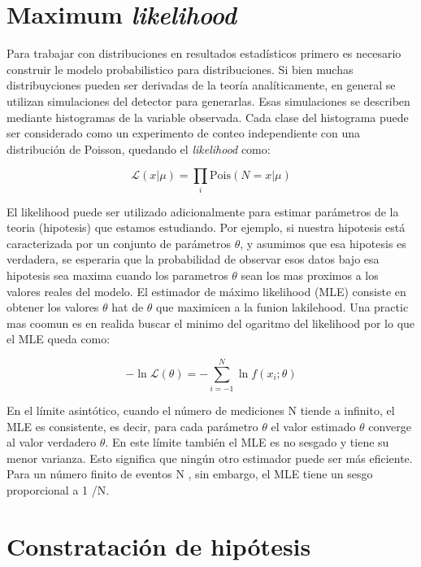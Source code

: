 \section{Maximum \textit{likelihood}}

Para trabajar con distribuciones en resultados estadísticos primero es necesario construir le modelo probabilistico para distribuciones. Si bien muchas distribuyciones pueden ser derivadas de la teoría analíticamente, en general se utilizan simulaciones del detector para generarlas. Esas simulaciones se describen mediante histogramas de la variable observada. Cada clase del histograma puede ser considerado como un experimento de conteo independiente con una distribución de Poisson, quedando el \textit{likelihood} como:

\begin{equation}
	\mathcal{L}(x|\mu) = \prod_i \text{Pois}(N=x|\mu) 
\end{equation}


El likelihood puede ser utilizado adicionalmente para estimar parámetros de la teoria (hipotesis) que estamos estudiando. Por ejemplo, si nuestra hipotesis está caracterizada por un conjunto de parámetros \textbf{$\theta$}, y asumimos que esa hipotesis es verdadera, se esperaria que la probabilidad de observar esos datos bajo esa hipotesis sea maxima cuando los parametros \textbf{$\theta$} sean los mas proximos a los valores reales del modelo. El estimador de máximo likelihood (MLE) consiste en obtener los valores \textbf{$\theta$} hat de \textbf{$\theta$} que maximicen a la funion lakilehood. Una practic mas coomun es en realida buscar el minimo del ogaritmo del likelihood por lo que el MLE queda como:

\begin{equation}
	-\ln{\mathcal{L}(\theta)} = - \sum_{i=-1}^{N}\ln{f(x_i; \theta)}
\end{equation}



En el límite asintótico, cuando el número de mediciones N tiende a infinito, el MLE es consistente,
es decir, para cada parámetro \textbf{$\theta$} el valor estimado \textbf{$\theta$} converge al valor verdadero \textbf{$\theta$}. En este límite
también el MLE es no sesgado y tiene su menor varianza. Esto significa que ningún otro estimador
puede ser más eficiente. Para un número finito de eventos N , sin embargo, el MLE tiene un sesgo
proporcional a 1 /N.


\section{Constratación de hipótesis}

